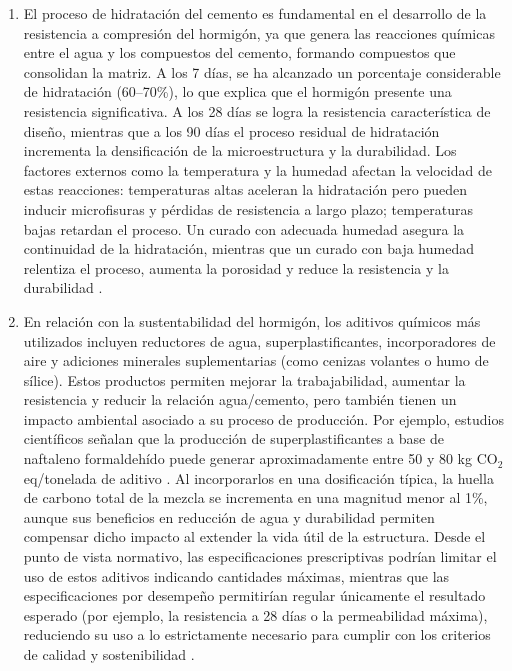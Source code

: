 \begin{enumerate}
    \item El proceso de hidratación del cemento es fundamental en el desarrollo de la resistencia a compresión del hormigón, ya que genera las reacciones químicas entre el agua y los compuestos del cemento, formando compuestos que consolidan la matriz. A los 7 días, se ha alcanzado un porcentaje considerable de hidratación (60–70\%), lo que explica que el hormigón presente una resistencia significativa. A los 28 días se logra la resistencia característica de diseño, mientras que a los 90 días el proceso residual de hidratación incrementa la densificación de la microestructura y la durabilidad. Los factores externos como la temperatura y la humedad afectan la velocidad de estas reacciones: temperaturas altas aceleran la hidratación pero pueden inducir microfisuras y pérdidas de resistencia a largo plazo; temperaturas bajas retardan el proceso. Un curado con adecuada humedad asegura la continuidad de la hidratación, mientras que un curado con baja humedad relentiza el proceso, aumenta la porosidad y reduce la resistencia y la durabilidad \citep{NCh170-2016}.

    \item En relación con la sustentabilidad del hormigón, los aditivos químicos más utilizados incluyen reductores de agua, superplastificantes, incorporadores de aire y adiciones minerales suplementarias (como cenizas volantes o humo de sílice). Estos productos permiten mejorar la trabajabilidad, aumentar la resistencia y reducir la relación agua/cemento, pero también tienen un impacto ambiental asociado a su proceso de producción. Por ejemplo, estudios científicos señalan que la producción de superplastificantes a base de naftaleno formaldehído puede generar aproximadamente entre 50 y 80 kg CO$_2$ eq/tonelada de aditivo \citep{Habert2011,Flower2007}. Al incorporarlos en una dosificación típica, la huella de carbono total de la mezcla se incrementa en una magnitud menor al 1\%, aunque sus beneficios en reducción de agua y durabilidad permiten compensar dicho impacto al extender la vida útil de la estructura. Desde el punto de vista normativo, las especificaciones prescriptivas podrían limitar el uso de estos aditivos indicando cantidades máximas, mientras que las especificaciones por desempeño permitirían regular únicamente el resultado esperado (por ejemplo, la resistencia a 28 días o la permeabilidad máxima), reduciendo su uso a lo estrictamente necesario para cumplir con los criterios de calidad y sostenibilidad \citep{NCh170-2016}.


\end{enumerate}
